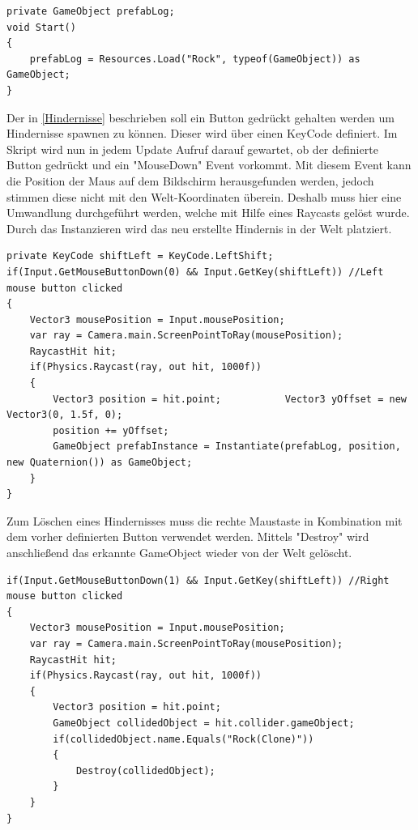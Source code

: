 \begin{lstlisting}[caption={Laden des Hindernisses},label={lst:Hinderniss_laden}]
private GameObject prefabLog;
void Start()
{
	prefabLog = Resources.Load("Rock", typeof(GameObject)) as GameObject;
}
\end{lstlisting}

Der in \ref{Hindernisse} beschrieben soll ein Button gedrückt gehalten werden um Hindernisse spawnen zu können. Dieser wird über einen KeyCode definiert. Im Skript wird nun in jedem Update Aufruf darauf gewartet, ob der definierte Button gedrückt und ein "MouseDown" Event vorkommt. Mit diesem Event kann die Position der Maus auf dem Bildschirm herausgefunden werden, jedoch stimmen diese nicht mit den Welt-Koordinaten überein. Deshalb muss hier eine Umwandlung durchgeführt werden, welche mit Hilfe eines Raycasts gelöst wurde. Durch das Instanzieren wird das neu erstellte Hindernis in der Welt platziert.

\begin{lstlisting}[caption={Erstellen des Hindernisses},label={lst:Hinderniss_erstellen}]
private KeyCode shiftLeft = KeyCode.LeftShift;
if(Input.GetMouseButtonDown(0) && Input.GetKey(shiftLeft)) //Left mouse button clicked
{
	Vector3 mousePosition = Input.mousePosition;
	var ray = Camera.main.ScreenPointToRay(mousePosition);
	RaycastHit hit;
	if(Physics.Raycast(ray, out hit, 1000f))
	{
		Vector3 position = hit.point;			Vector3 yOffset = new Vector3(0, 1.5f, 0);
		position += yOffset;			
		GameObject prefabInstance = Instantiate(prefabLog, position, new Quaternion()) as GameObject;
	}
}
\end{lstlisting}

Zum Löschen eines Hindernisses muss die rechte Maustaste in Kombination mit dem vorher definierten Button verwendet werden. Mittels "Destroy" wird anschließend das erkannte GameObject wieder von der Welt gelöscht.

\begin{lstlisting}[caption={Zerstören des Hindernisses},label={lst:Hinderniss_zerstören}]
if(Input.GetMouseButtonDown(1) && Input.GetKey(shiftLeft)) //Right mouse button clicked
{
	Vector3 mousePosition = Input.mousePosition;
	var ray = Camera.main.ScreenPointToRay(mousePosition);
	RaycastHit hit;
	if(Physics.Raycast(ray, out hit, 1000f))
	{
		Vector3 position = hit.point;
		GameObject collidedObject = hit.collider.gameObject;
		if(collidedObject.name.Equals("Rock(Clone)"))
		{
			Destroy(collidedObject);
		}
	}
}
\end{lstlisting}

